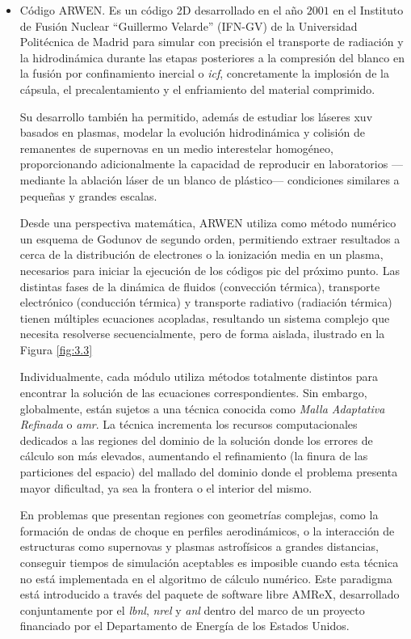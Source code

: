 \begin{itemize}

    \item Código ARWEN. Es un código 2D desarrollado en el año $2001$ en el Instituto de Fusión Nuclear \enquote{Guillermo Velarde} (IFN-GV) de la Universidad Politécnica de Madrid\autocite{Ogando2001} para simular con precisión el transporte de radiación y la hidrodinámica durante las etapas posteriores a la compresión del blanco en la fusión por confinamiento inercial\autocite{Velarde2005} o \emph{\acrfull{icf}}, concretamente la implosión de la cápsula, el precalentamiento y el enfriamiento del material comprimido.

      Su desarrollo también ha permitido, además de estudiar los láseres \acrshort{xuv} basados en plasmas\autocite{Oliva2009,Oliva2010}, modelar la evolución hidrodinámica y colisión de remanentes de supernovas en un medio interestelar homogéneo\autocite{Velarde2006}, proporcionando adicionalmente la capacidad de reproducir en laboratorios ---mediante la ablación láser de un blanco de plástico--- condiciones similares a pequeñas y grandes escalas. 

      Desde una perspectiva matemática, ARWEN utiliza como método numérico un esquema de Godunov de segundo orden, permitiendo extraer resultados a cerca de la distribución de electrones o la ionización media en un plasma, necesarios para iniciar la ejecución de los códigos \acrfull{pic} del próximo punto. Las distintas fases de la dinámica de fluidos (convección térmica), transporte electrónico (conducción térmica) y transporte radiativo (radiación térmica) tienen múltiples ecuaciones acopladas, resultando un sistema complejo que necesita resolverse secuencialmente, pero de forma aislada, ilustrado en la Figura \ref{fig:3.3}

      Individualmente, cada módulo utiliza métodos totalmente distintos para encontrar la solución de las ecuaciones correspondientes. Sin embargo, globalmente, están sujetos a una técnica conocida como \emph{Malla Adaptativa Refinada} o \emph{\acrfull{amr}}\autocite{Berger1989,Rendleman2000}. La técnica incrementa los recursos computacionales dedicados a las regiones del dominio de la solución donde los errores de cálculo son más elevados, aumentando el refinamiento (la finura de las particiones del espacio) del mallado del dominio donde el problema presenta mayor dificultad, ya sea la frontera o el interior del mismo.

     En problemas que presentan regiones con geometrías complejas, como la formación de ondas de choque en perfiles aerodinámicos, o la interacción de estructuras como supernovas y plasmas astrofísicos a grandes distancias, conseguir tiempos de simulación aceptables es imposible cuando esta técnica no está implementada en el algoritmo de cálculo numérico. Este paradigma está introducido a través del paquete de software libre AMReX\autocite{Zhang2019a}, desarrollado conjuntamente por el \emph{\acrfull{lbnl}}, \emph{\acrfull{nrel}} y \emph{\acrfull{anl}} dentro del marco de un proyecto financiado por el Departamento de Energía de los Estados Unidos.


\end{itemize}
